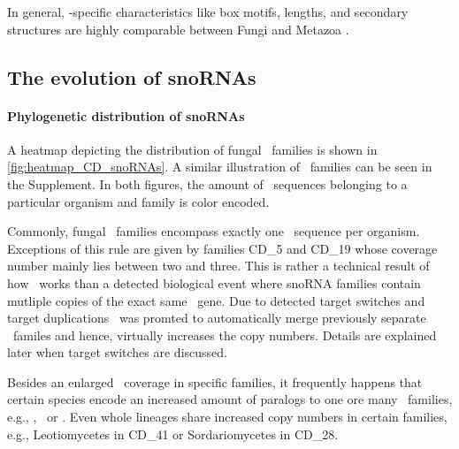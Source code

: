In general, \sno -specific characteristics like box motifs, lengths,
and secondary structures are highly comparable between Fungi and
Metazoa \cite{Kehr:2014}. 


\subsection{The evolution of snoRNAs}
  
\paragraph{\textbf{Phylogenetic distribution of snoRNAs}}
A heatmap depicting the distribution of  fungal \cd\ families is shown
in \ref{fig:heatmap_CD_snoRNAs}. A similar illustration of \haca\
families can be seen in the Supplement. In both figures, the amount of
\sno\ sequences belonging to a particular organism and family is color
encoded. 

Commonly, fungal \sno\ families encompass exactly one \sno\ sequence
per organism. Exceptions of this rule are given by 
families CD\_5 and CD\_19 whose coverage number mainly lies between two and
three. This is rather a technical result of how \snostrip\ works than a
detected biological event where snoRNA families contain mutliple
copies of the exact same \sno\ gene. Due to detected target
switches and target duplications \snostrip\ was promted to
automatically merge previously separate \sno\ familes and hence,
virtually increases the copy numbers. Details are explained
later when target switches are discussed. 

Besides an enlarged
\sno\ coverage in specific families, it frequently happens that
certain species encode an increased amount of paralogs to one ore
many \sno\ families, e.g., \Ppl, \Asp\ or \Nfu. Even
whole lineages share increased copy numbers in certain families, e.g., 
Leotiomycetes in CD\_41 or Sordariomycetes in CD\_28.

